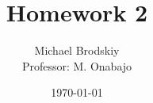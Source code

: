


\title{Homework 2}
\date{\today}
\author{Michael Brodskiy\\ \small Professor: M. Onabajo}



\maketitle

